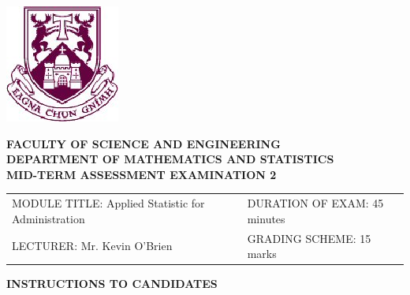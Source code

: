 \documentclass[a4paper,12pt]{article}
\begin{document}
	\begin{center}
		\includegraphics[scale=0.60]{images/shieldtransparent2}
	\end{center}
	
	\begin{center}
		\vspace{1cm}
		\large \bf {FACULTY OF SCIENCE AND ENGINEERING} \\[0.5cm]
		\normalsize DEPARTMENT OF MATHEMATICS AND STATISTICS \\[1.25cm]
		\large \bf {MID-TERM ASSESSMENT EXAMINATION 2} \\[1.0cm]
	\end{center}
	
	\begin{tabular}{ll}
		MODULE TITLE: Applied Statistic for Administration  & DURATION OF EXAM: 45 minutes \\[1cm]
		LECTURER: Mr. Kevin O'Brien & GRADING SCHEME: 15 marks \\
	\end{tabular}
	\bigskip
	\begin{center}
		{\bf INSTRUCTIONS TO CANDIDATES}
	\end{center}
	
\end{document}
